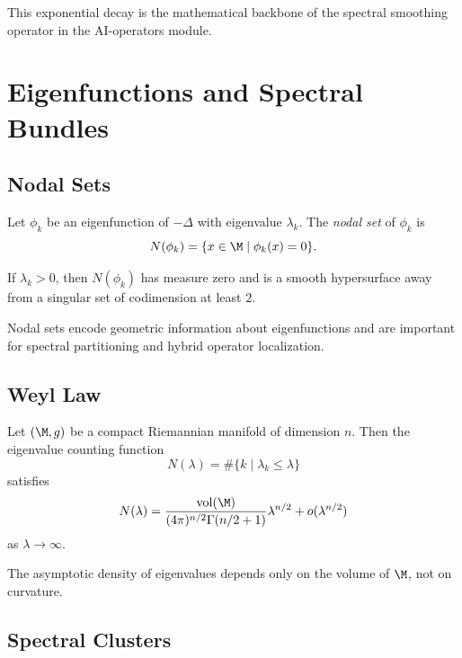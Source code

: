 \begin{remark}
This exponential decay is the mathematical backbone of the spectral smoothing operator in the AI-operators module.
\end{remark}


\section{Eigenfunctions and Spectral Bundles}

\subsection{Nodal Sets}

\begin{definition}
Let $\phi_k$ be an eigenfunction of $-\Delta$ with eigenvalue $\lambda_k$.
The \emph{nodal set} of $\phi_k$ is
\[
N(\phi_k) = \{ x \in \M \mid \phi_k(x) = 0 \}.
\]
\end{definition}

\begin{lemma}
If $\lambda_k > 0$, then $N(\phi_k)$ has measure zero and is a smooth
hypersurface away from a singular set of codimension at least $2$.
\end{lemma}

\begin{remark}
Nodal sets encode geometric information about eigenfunctions and are
important for spectral partitioning and hybrid operator localization.
\end{remark}

\subsection{Weyl Law}

\begin{theorem}
Let $(\M,g)$ be a compact Riemannian manifold of dimension $n$.  
Then the eigenvalue counting function
\[
N(\lambda) = \#\{ k \mid \lambda_k \le \lambda \}
\]
satisfies
\[
N(\lambda)
= \frac{\mathrm{vol}(\M)}{(4\pi)^{n/2} \Gamma(n/2 + 1)} \lambda^{n/2}
+ o(\lambda^{n/2})
\]
as $\lambda \to \infty$.
\end{theorem}

\begin{lemma}
The asymptotic density of eigenvalues depends only on the volume of $\M$,
not on curvature.
\end{lemma}

\subsection{Spectral Clusters}

